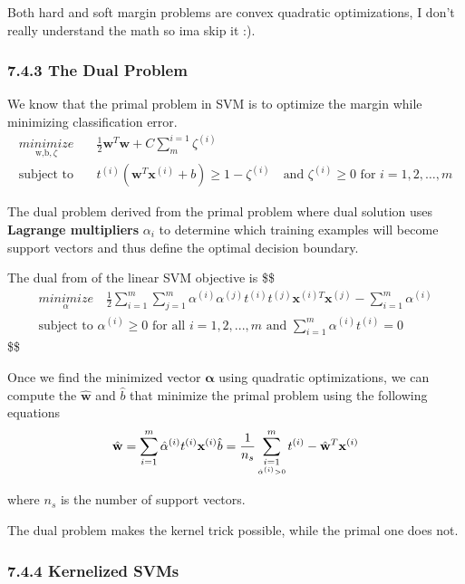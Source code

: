 \documentclass[
  letterpaper,
  DIV=11,
  numbers=noendperiod]{scrartcl}
\begin{document}
Both hard and soft margin problems are convex quadratic optimizations, I
don't really understand the math so ima skip it :).

\subsubsection{7.4.3 The Dual Problem}\label{the-dual-problem}

We know that the primal problem in SVM is to optimize the margin while
minimizing classification error. \[
\begin{align*}
\underset{\text{w,b},\zeta}{minimize} \quad & \frac{1}{2} \mathbf{w}^T \mathbf{w}  + C\sum_m^{i=1}\zeta^{(i)} \\
\text{subject to} \quad & t^{(i)} \left( \mathbf{w}^T\mathbf{x}^{(i)} + b \right) \geq 1 - \zeta^{(i)} \quad \text{and } \zeta^{(i)} \geq 0 \text{ for } i = 1, 2, \dots, m
\end{align*}
\]

The dual problem derived from the primal problem where dual solution
uses \textbf{Lagrange multipliers} \(\alpha_i\) to determine which
training examples will become support vectors and thus define the
optimal decision boundary.

The dual from of the linear SVM objective is \$\$ \begin{align*}
\underset{\alpha}{minimize} \quad \frac{1}{2}\sum^m_{i=1} \sum^m_{j=1} \alpha^{(i)} \alpha^{(j)} t^{(i)} t^{(j)} \mathbf{x}^{(i)T} \mathbf{x}^{(j)} - \sum^m_{i=1} \alpha^{(i)} \\

\text{subject to } \alpha^{(i)} \geq 0 \text{ for all } i = 1,2,...,m \text{ and } \sum^m_{i=1} \alpha^{(i)}t^{(i)} = 0 
\end{align*} \$\$

Once we find the minimized vector \(\mathbf{\alpha}\) using quadratic
optimizations, we can compute the \(\hat{\mathbf{w}}\) and \(\hat{b}\)
that minimize the primal problem using the following equations \[
\hat{\mathbf{w}} = \sum^m_{i=1}\hat{\alpha}^{(i)}t^{(i)}\mathbf{x}^{(i)} \\
\hat{b} = \frac{1}{n_s} \sum^m_{\underset{\hat{\alpha}^{(i)}> 0}{i=1}} t^{(i)} - \hat{\mathbf{w}}^T\mathbf{x}^{(i)}
\]

where \(n_s\) is the number of support vectors.

The dual problem makes the kernel trick possible, while the primal one
does not.

\subsubsection{7.4.4 Kernelized SVMs}\label{kernelized-svms}
\end{document}
